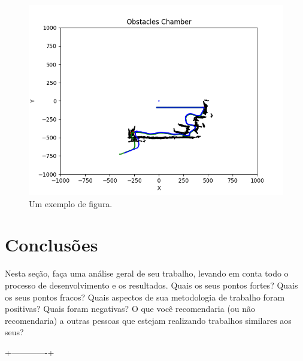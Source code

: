 \documentclass[twoside,conference,a4paper]{IEEEtran}
\begin{document}
\begin{figure}[ht]
\centering
\includegraphics[width=1\hsize]{figuras/figure_1.png}
\caption{Um exemplo de figura.}
\label{a}
\end{figure}

\section{Conclusões}

Nesta seção, faça uma análise geral de seu trabalho, levando em conta todo o processo de desenvolvimento e os resultados. Quais os seus pontos fortes? Quais os seus pontos fracos? Quais aspectos de sua metodologia de trabalho foram positivas? Quais foram negativas? O que você recomendaria (ou não recomendaria) a outras pessoas que estejam realizando trabalhos similares aos seus? 


 +-------------+





\end{document}
